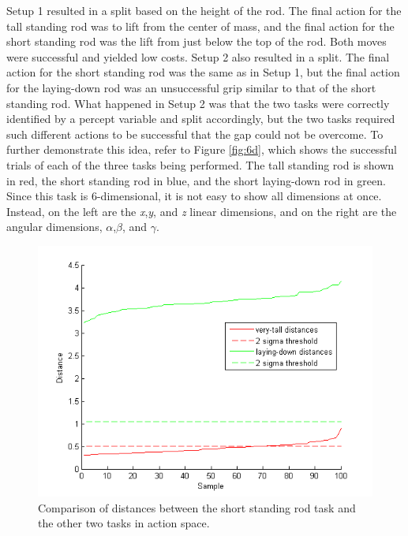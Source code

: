 \documentclass[12pt]{article}
\begin{document}
Setup 1 resulted in a split based on the height of the rod. The final action for the tall standing rod was to lift from the center of mass, and the final action for the short standing rod was the lift from just below the top of the rod. Both moves were successful and yielded low costs. Setup 2 also resulted in a split. The final action for the short standing rod was the same as in Setup 1, but the final action for the laying-down rod was an unsuccessful grip similar to that of the short standing rod. What happened in Setup 2 was that the two tasks were correctly identified by a percept variable and split accordingly, but the two tasks required such different actions to be successful that the gap could not be overcome. To further demonstrate this idea, refer to Figure \ref{fig:6d}, which shows the successful trials of each of the three tasks being performed. The tall standing rod is shown in red, the short standing rod in blue, and the short laying-down rod in green. Since this task is 6-dimensional, it is not easy to show all dimensions at once. Instead, on the left are the \emph{x},\emph{y}, and \emph{z} linear dimensions, and on the right are the angular dimensions, \emph{$\alpha$},\emph{$\beta$}, and \emph{$\gamma$}. 

\begin{figure}[ht]
  \centering
  \includegraphics[width=0.8\columnwidth]{distance.png}
  \caption{\label{fig_distance} Comparison of distances between the short standing rod task and the other two tasks in action space.}
  \label{fig:distance}
\end{figure}
\end{document}
